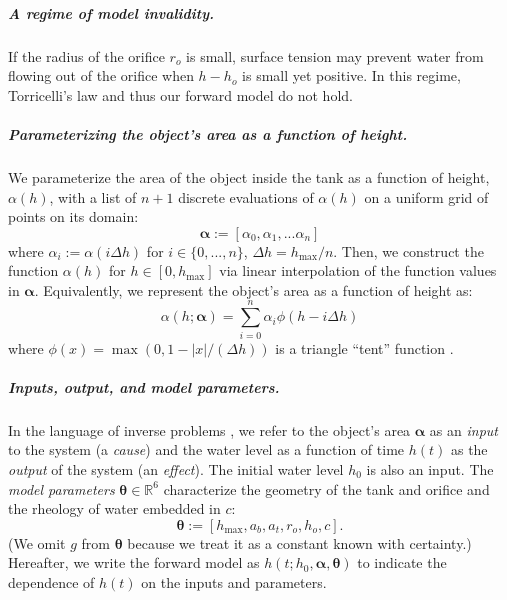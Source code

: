 \documentclass[openacc]{rsproca_new}%
\newcommand\themodel {$h(t; h_0, \boldsymbol \alpha, \boldsymbol\theta)$\xspace}
\begin{document}
\vspace{-\baselineskip}
\subparagraph{A regime of model invalidity.} If the radius of the orifice $r_o$ is small, surface tension may prevent water from flowing out of the orifice when $h- h_o$ is small yet positive. In this regime, Torricelli's law and thus our forward model do not hold.

\vspace{-\baselineskip}
\subparagraph{Parameterizing the object's area as a function of height.}
We parameterize the area of the object inside the tank as a function of height, $\alpha(h)$, with a list of $n+1$ discrete evaluations of $\alpha(h)$ on a uniform grid of points on its domain:
\begin{equation}
	\boldsymbol \alpha := [\alpha_0, \alpha_1, ... \alpha_n] \label{eq:alpha}
\end{equation}
where $\alpha_i :=\alpha(i \Delta h)$ for $i \in \{0, ..., n\}$, $\Delta h = h_{\text{max}}/n$. Then, we construct the function $\alpha(h)$ for $h\in [0, h_{\text{max}}]$ via linear interpolation of the function values in $\boldsymbol \alpha$. Equivalently, we represent the object's area as a function of height as:
\begin{equation}
	\alpha(h; \boldsymbol \alpha) = \sum_{i=0}^n \alpha_i \phi(h-i \Delta h) \label{eq:alpha_basis}
\end{equation} where $\phi(x)= \max(0, 1-\lvert x \rvert / (\Delta h)) $ is a triangle ``tent'' function \cite{hat_functions}.

\vspace{-\baselineskip}
\subparagraph{Inputs, output, and model parameters.} 
In the language of inverse problems \cite{groetsch1999inverse,waqar2023tutorial}, we refer to the object's area $\boldsymbol \alpha$ as an \emph{input} to the system (a \emph{cause}) and the water level as a function of time $h(t)$ as the \emph{output} of the system (an \emph{effect}).
The initial water level $h_0$ is also an input.  
The \emph{model parameters} $\boldsymbol \theta \in \mathbb{R}^6$ characterize the geometry of the tank and orifice and the rheology of water embedded in $c$:
\begin{equation}
	\boldsymbol \theta := [h_{\text{max}}, a_b, a_t, r_o, h_o, c]. \label{eq:theta}
\end{equation}
(We omit $g$ from $\boldsymbol \theta$ because we treat it as a constant known with certainty.)
Hereafter, we write the forward model as \themodel to indicate the dependence of $h(t)$ on the inputs and parameters.
\end{document}
